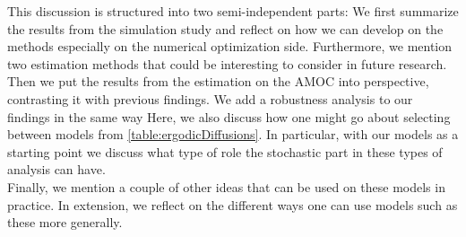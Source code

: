 This discussion is structured into two semi-independent parts: We first summarize the results from the simulation study and reflect on how we can develop on the methods especially on the numerical optimization side. Furthermore, we mention two estimation methods that could be interesting to consider in future research.\\
Then we put the results from the estimation on the AMOC into perspective, contrasting it with previous findings. We add a robustness analysis to our findings in the same way  Here, we also discuss how one might go about selecting between models from \ref{table:ergodicDiffusions}. In particular, with our models as a starting point we discuss what type of role the stochastic part in these types of analysis can have. \\
Finally, we mention a couple of other ideas that can be used on these models in practice. In extension, we reflect on the different ways one can use models such as these more generally.
